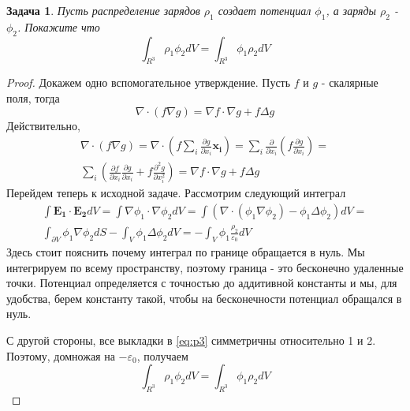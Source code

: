\documentclass[a4paper,12pt]{article}
\newtheorem{problem}{Задача}
\newenvironment{solution}{\renewcommand{\proofname}{\unskip\indent\nopunct}\begin{proof}}{\end{proof}}
\numberwithin{equation}{section}
\begin{document}
\begin{problem}
    {\normalfont \cite[p.~164, Problem 3.50(a)]{Griffiths:1492149}}
    Пусть распределение зарядов $\rho_1$ создает потенциал $\phi_1$, а заряды $\rho_2$ - $\phi_2$.
    Покажите что
\begin{equation}
    \int_{R^3} \rho_1 \phi_2 dV = \int_{R^3} \phi_1 \rho_2 dV
\end{equation}
\end{problem}
\begin{solution}
Докажем одно вспомогательное утверждение.
Пусть $f$ и $g$ - скалярные поля, тогда
\begin{equation}
    \nabla \cdot (f \nabla g) = \nabla f \cdot \nabla g + f \Delta g
\end{equation}
Действительно,
\begin{multline}
    \nabla \cdot (f \nabla g) = \nabla \cdot \left( f \sum_i \frac{\partial g}{\partial x_i} \bm{x_i} \right) =
    \sum_i \frac{\partial}{\partial x_i} \left( f \frac{\partial g}{\partial x_i} \right) = \\
    \sum_i \left( \frac{\partial f}{\partial x_i} \frac{\partial g}{\partial x_i} + f \frac{\partial^2 g}{\partial x_i^2} \right) =
    \nabla f \cdot \nabla g + f \Delta g
\end{multline}
Перейдем теперь к исходной задаче.
Рассмотрим следующий интеграл
\begin{multline}\label{eq:p3}
    \int \bm{E_1} \cdot \bm{E_2} dV = \int \nabla \phi_1 \cdot \nabla \phi_2 dV =
    \int \left( \nabla \cdot (\phi_1 \nabla \phi_2) - \phi_1 \Delta \phi_2 \right) dV = \\
    \int_{\partial V} \phi_1 \nabla \phi_2 dS - \int_V \phi_1 \Delta \phi_2 dV =
    - \int_V \phi_1 \frac{\rho_2}{\varepsilon_0} dV
\end{multline}
Здесь стоит пояснить почему интеграл по границе обращается в нуль.
Мы интегрируем по всему пространству, поэтому граница - это бесконечно удаленные точки.
Потенциал определяется с точностью до аддитивной константы и мы, для удобства, берем константу такой, чтобы на бесконечности потенциал обращался в нуль.

С другой стороны, все выкладки в \ref{eq:p3} симметричны относительно 1 и 2.
Поэтому, домножая на $-\varepsilon_0$, получаем
\begin{equation}
    \int_{R^3} \rho_1 \phi_2 dV = \int_{R^3} \phi_1 \rho_2 dV
\end{equation}
\end{solution}
\end{document}
